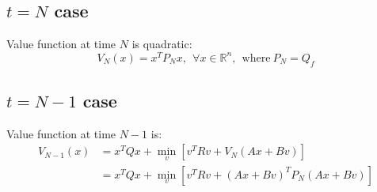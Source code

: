 \documentclass[10pt,a4paper,oneside]{article}
\begin{document}
\subsection{$t=N$ case}
Value function at time $N$ is quadratic:
\[
V_N(x)=x^TP_Nx,\ \ \forall x\in \mathbb{R}^n,\ \ \text{where} \ P_N=Q_f
\]
\subsection{$t=N-1$ case}
Value function at time $N-1$ is:
$$
\begin{aligned}
V_{N-1}(x)&=x^TQx+\min_{v}[v^TRv+V_{N}(Ax+Bv)]\\&=x^TQx+\min_{v}[v^TRv+(Ax+Bv)^TP_N(Ax+Bv)]
\end{aligned}
$$
\end{document}
